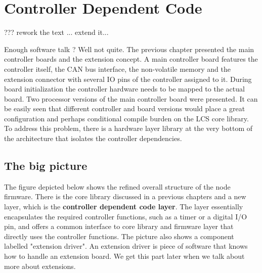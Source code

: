 
\chapter{Controller Dependent Code}

??? rework the text ... extend it...

Enough software talk ? Well not quite. The previous chapter presented the main controller boards and the extension concept. A main controller board features the controller itself, the CAN bus interface, the non-volatile memory and the extension connector with several IO pins of the controller assigned to it. During board initialization the controller hardware needs to be mapped to the actual board. Two processor versions of the main controller board were presented. It can be easily seen that different controller and board versions would place a great configuration and perhaps conditional compile burden on the LCS core library. To address this problem, there is a hardware layer library at the very bottom of the architecture that isolates the controller dependencies.

\section{The big picture}

The figure depicted below shows the refined overall structure of the node firmware. There is the core library discussed in a previous chapters and a new layer, which is the \textbf{controller dependent code layer}. The layer essentially encapsulates the required controller functions, such as a timer or a digital I/O pin, and offers a common interface to core library and firmware layer that directly uses the controller functions. The picture also shows a component labelled "extension driver". An extension driver is piece of software that knows how to handle an extension board. We get this part later when we talk about more about extensions.

